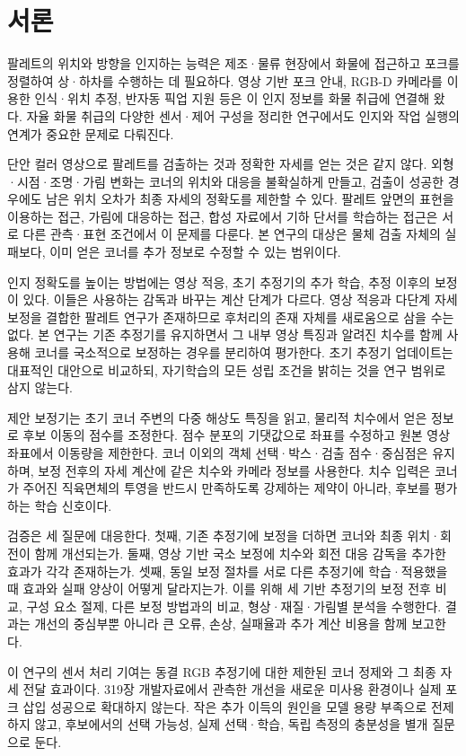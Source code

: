\section{서론}\label{sec:introduction}
팔레트의 위치와 방향을 인지하는 능력은 제조·물류 현장에서 화물에 접근하고 포크를 정렬하여 상·하차를 수행하는 데 필요하다. 영상 기반 포크 안내\cite{seelinger2006}, RGB-D 카메라를 이용한 인식·위치 추정\cite{xiao2017}, 반자동 픽업 지원\cite{molter2019} 등은 이 인지 정보를 화물 취급에 연결해 왔다. 자율 화물 취급의 다양한 센서·제어 구성을 정리한 연구\cite{kohne2026}에서도 인지와 작업 실행의 연계가 중요한 문제로 다뤄진다.

단안 컬러 영상으로 팔레트를 검출하는 것과 정확한 자세를 얻는 것은 같지 않다. 외형·시점·조명·가림 변화는 코너의 위치와 대응을 불확실하게 만들고, 검출이 성공한 경우에도 남은 위치 오차가 최종 자세의 정확도를 제한할 수 있다. 팔레트 앞면의 표현을 이용하는 접근\cite{kai2025}, 가림에 대응하는 접근\cite{vu2024}, 합성 자료에서 기하 단서를 학습하는 접근\cite{beleznai2025}은 서로 다른 관측·표현 조건에서 이 문제를 다룬다. 본 연구의 대상은 물체 검출 자체의 실패보다, 이미 얻은 코너를 추가 정보로 수정할 수 있는 범위이다.

인지 정확도를 높이는 방법에는 영상 적응, 초기 추정기의 추가 학습, 추정 이후의 보정이 있다. 이들은 사용하는 감독과 바꾸는 계산 단계가 다르다. 영상 적응과 다단계 자세 보정을 결합한 팔레트 연구\cite{elmoaqet2025}가 존재하므로 후처리의 존재 자체를 새로움으로 삼을 수는 없다. 본 연구는 기존 추정기를 유지하면서 그 내부 영상 특징과 알려진 치수를 함께 사용해 코너를 국소적으로 보정하는 경우를 분리하여 평가한다. 초기 추정기 업데이트는 대표적인 대안으로 비교하되, 자기학습의 모든 성립 조건을 밝히는 것을 연구 범위로 삼지 않는다.

제안 보정기는 초기 코너 주변의 다중 해상도 특징을 읽고, 물리적 치수에서 얻은 정보로 후보 이동의 점수를 조정한다. 점수 분포의 기댓값으로 좌표를 수정하고 원본 영상 좌표에서 이동량을 제한한다. 코너 이외의 객체 선택·박스·검출 점수·중심점은 유지하며, 보정 전후의 자세 계산에 같은 치수와 카메라 정보를 사용한다. 치수 입력은 코너가 주어진 직육면체의 투영을 반드시 만족하도록 강제하는 제약이 아니라, 후보를 평가하는 학습 신호이다.

검증은 세 질문에 대응한다. 첫째, 기존 추정기에 보정을 더하면 코너와 최종 위치·회전이 함께 개선되는가. 둘째, 영상 기반 국소 보정에 치수와 회전 대응 감독을 추가한 효과가 각각 존재하는가. 셋째, 동일 보정 절차를 서로 다른 추정기에 학습·적용했을 때 효과와 실패 양상이 어떻게 달라지는가. 이를 위해 세 기반 추정기의 보정 전후 비교, 구성 요소 절제, 다른 보정 방법과의 비교, 형상·재질·가림별 분석을 수행한다. 결과는 개선의 중심부뿐 아니라 큰 오류, 손상, 실패율과 추가 계산 비용을 함께 보고한다.

이 연구의 센서 처리 기여는 동결 RGB 추정기에 대한 제한된 코너 정제와 그 최종 자세 전달 효과이다. 319장 개발자료에서 관측한 개선을 새로운 미사용 환경이나 실제 포크 삽입 성공으로 확대하지 않는다. 작은 추가 이득의 원인을 모델 용량 부족으로 전제하지 않고, 후보에서의 선택 가능성, 실제 선택·학습, 독립 측정의 충분성을 별개 질문으로 둔다.
